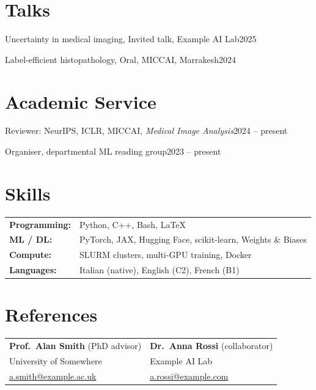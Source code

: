 \documentclass[11pt,a4paper]{article}
\newcommand{\cvline}[2]{#1\hfill #2\par}
\begin{document}
\section{Talks}
\cvline{Uncertainty in medical imaging, Invited talk, Example AI Lab}{2025}
\cvline{Label-efficient histopathology, Oral, MICCAI, Marrakesh}{2024}

\section{Academic Service}
\cvline{Reviewer: NeurIPS, ICLR, MICCAI, \textit{Medical Image Analysis}}{2024 -- present}
\cvline{Organiser, departmental ML reading group}{2023 -- present}

\section{Skills}
\begin{tabular}{@{}ll@{}}
  \textbf{Programming:} & Python, C++, Bash, \LaTeX \\
  \textbf{ML / DL:}     & PyTorch, JAX, Hugging Face, scikit-learn, Weights \& Biases \\
  \textbf{Compute:}     & SLURM clusters, multi-GPU training, Docker \\
  \textbf{Languages:}   & Italian (native), English (C2), French (B1) \\
\end{tabular}

\section{References}
\begin{tabular}{@{}p{}p{}@{}}
  \textbf{Prof.~Alan Smith} (PhD advisor)     & \textbf{Dr.~Anna Rossi} (collaborator) \\
  University of Somewhere                     & Example AI Lab \\
  \href{mailto:a.smith@example.ac.uk}{a.smith@example.ac.uk} &
  \href{mailto:a.rossi@example.com}{a.rossi@example.com} \\
\end{tabular}
\end{document}
